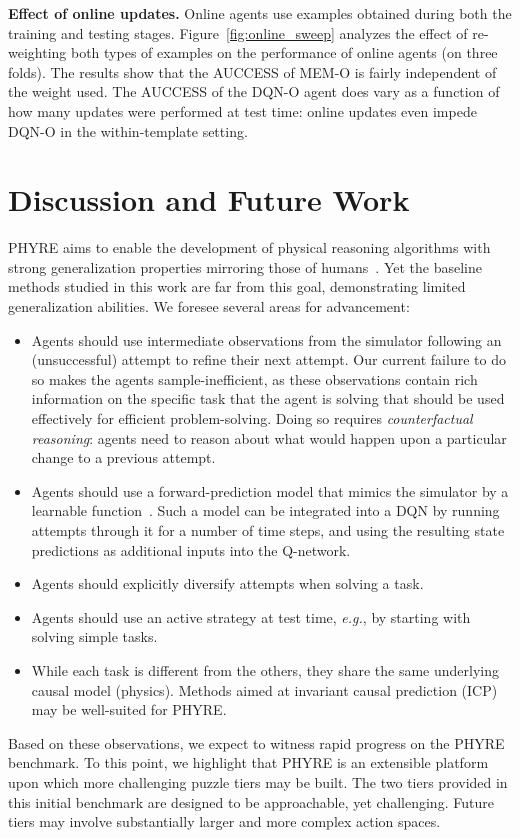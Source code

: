 \documentclass{article}
\begin{document}
\noindent\textbf{Effect of online updates.} Online agents use examples obtained during both the training and testing stages. Figure~\ref{fig:online_sweep} analyzes the effect of re-weighting both types of examples on the performance of online agents (on three folds). The results show that the AUCCESS of MEM-O is fairly independent of the weight used. The AUCCESS of the DQN-O agent does vary as a function of how many updates were performed at test time: online updates even impede DQN-O in the within-template setting.
 

\section{Discussion and Future Work}
\label{sec:discussion}
PHYRE aims to enable the development of physical reasoning algorithms with strong generalization properties mirroring those of humans~\cite{martin2008tubes}. Yet the baseline methods studied in this work are far from this goal, demonstrating limited generalization abilities. We foresee several areas for advancement:
\begin{itemize}[leftmargin=*]
\setlength\itemsep{0em}
\item Agents should use intermediate observations from the simulator following an (unsuccessful) attempt to refine their next attempt. Our current failure to do so makes the agents sample-inefficient, as these observations contain rich information on the specific task that the agent is solving that should be used effectively for efficient problem-solving. Doing so requires \emph{counterfactual reasoning}: agents need to reason about what would happen upon a particular change to a previous attempt.
\item Agents should use a forward-prediction model that mimics the simulator by a learnable function~\cite{henaff2017prediction}. Such a model can be integrated into a DQN by running attempts through it for a number of time steps, and using the resulting state predictions as additional inputs into the Q-network.
\item Agents should explicitly diversify attempts when solving a task.
\item Agents should use an active strategy at test time, \emph{e.g.}, by starting with solving simple tasks. 
\item While each task is different from the others, they share the same underlying causal model (physics). Methods aimed at invariant causal prediction (ICP)~\cite{heinze2018invariant,peters2014causal} may be well-suited for PHYRE.
\end{itemize}
Based on these observations, we expect to witness rapid progress on the PHYRE benchmark. To this point, we highlight that PHYRE is an extensible platform upon which more challenging puzzle tiers may be built. The two tiers provided in this initial benchmark are designed to be approachable, yet challenging. Future tiers may involve substantially larger and more complex action spaces. 
\end{document}
